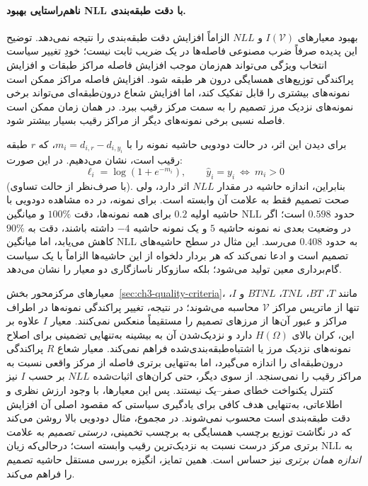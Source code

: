 \paragraph{ناهم‌راستایی بهبود NLL با دقت طبقه‌بندی.}
بهبود معیارهای $I(\mathcal V)$ و $NLL$ الزاماً افزایش دقت طبقه‌بندی را نتیجه نمی‌دهد. توضیح این پدیده صرفاً ضرب مصنوعی فاصله‌ها در یک ضریب ثابت نیست؛ خودِ تغییر سیاست انتخاب ویژگی می‌تواند هم‌زمان موجب افزایش فاصله مراکز طبقات و افزایش پراکندگی توزیع‌های همسایگی درون هر طبقه شود. افزایش فاصله مراکز ممکن است نمونه‌های بیشتری را قابل تفکیک کند، اما افزایش شعاع درون‌طبقه‌ای می‌تواند برخی نمونه‌های نزدیک مرز تصمیم را به سمت مرکز رقیب ببرد. در همان زمان ممکن است فاصله نسبی برخی نمونه‌های دیگر از مراکز رقیب بسیار بیشتر شود.

برای دیدن این اثر، در حالت دودویی حاشیه نمونه را با $m_i=d_{i,r}-d_{i,y_i}$، که $r$ طبقه رقیب است، نشان می‌دهیم. در این صورت:
\begin{equation}\label{eq:ch3-NLL-binary-margin-contrast}
\ell_i=\log(1+e^{-m_i}),
\qquad
\widehat y_i=y_i\ \Longleftrightarrow\ m_i>0
\end{equation}
(با صرف‌نظر از حالت تساوی). بنابراین، اندازه حاشیه در مقدار $NLL$ اثر دارد، ولی صحت تصمیم فقط به علامت آن وابسته است. برای نمونه، در ده مشاهده دودویی با حاشیه اولیه $0.2$ برای همه نمونه‌ها، دقت $100\%$ و میانگین NLL حدود $0.598$ است؛ اگر در وضعیت بعدی نه نمونه حاشیه $5$ و یک نمونه حاشیه $-4$ داشته باشند، دقت به $90\%$ کاهش می‌یابد، اما میانگین NLL به حدود $0.408$ می‌رسد. این مثال در سطح حاشیه‌های تصمیم است و ادعا نمی‌کند که هر بردار دلخواه از این حاشیه‌ها الزاماً با یک سیاست گام‌برداری معین تولید می‌شود؛ بلکه سازوکار ناسازگاری دو معیار را نشان می‌دهد.

معیارهای مرکز‌محور بخش~\ref{sec:ch3-quality-criteria}، مانند $T$، $BT$، $TNL$، $BTNL$ و $I$، تنها از ماتریس مراکز $\mathcal V$ محاسبه می‌شوند؛ در نتیجه، تغییر پراکندگی نمونه‌ها در اطراف مراکز و عبور آن‌ها از مرزهای تصمیم را مستقیماً منعکس نمی‌کنند. معیار $I$ علاوه بر این، کران بالای $H(\Omega)$ دارد و نزدیک‌شدن آن به بیشینه به‌تنهایی تضمینی برای اصلاح نمونه‌های نزدیک مرز یا اشتباه‌طبقه‌بندی‌شده فراهم نمی‌کند. معیار شعاع $R$ پراکندگی درون‌طبقه‌ای را اندازه می‌گیرد، اما به‌تنهایی برتری فاصله از مرکز واقعی نسبت به مراکز رقیب را نمی‌سنجد. از سوی دیگر، حتی کران‌های اثبات‌شده $NLL$ بر حسب $I$ نیز کنترل یکنواخت خطای صفر--یک نیستند. پس این معیارها، با وجود ارزش نظری و اطلاعاتی،
به‌تنهایی هدف کافی برای یادگیری سیاستی
که مقصود اصلی آن افزایش دقت طبقه‌بندی است
محسوب نمی‌شوند.
در مجموع، مثال دودویی بالا روشن می‌کند
که در نگاشت توزیع برچسب همسایگی
به برچسب تخمینی، \emph{درستی تصمیم}
به علامت برتری مرکز درست نسبت به
نزدیک‌ترین رقیب وابسته است؛
درحالی‌که زیان NLL به \emph{اندازه
همان برتری} نیز حساس است.
همین تمایز، انگیزه بررسی مستقل
حاشیه تصمیم را فراهم می‌کند.

